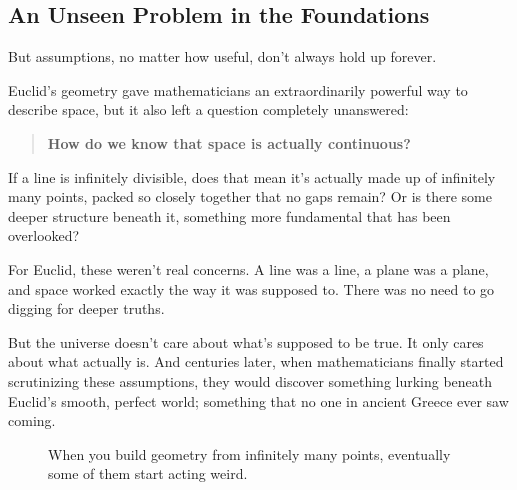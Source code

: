 \subsection{An Unseen Problem in the Foundations}

But assumptions, no matter how useful, don’t always hold up forever.

Euclid’s geometry gave mathematicians an extraordinarily powerful way to describe space, but it also left a question completely unanswered:  

\begin{quote}
\textbf{How do we know that space is actually continuous?}
\end{quote}

If a line is infinitely divisible, does that mean it’s actually made up of infinitely many points, packed so closely together that no gaps remain? Or is there some deeper structure beneath it, something more fundamental that has been overlooked?

For Euclid, these weren’t real concerns. A line was a line, a plane was a plane, and space worked exactly the way it was supposed to. There was no need to go digging for deeper truths.

But the universe doesn’t care about what’s supposed to be true. It only cares about what actually is. And centuries later, when mathematicians finally started scrutinizing these assumptions, they would discover something lurking beneath Euclid’s smooth, perfect world; something that no one in ancient Greece ever saw coming.



\begin{figure}[H]
\centering
{}
\caption{When you build geometry from infinitely many points, eventually some of them start acting weird.}
\end{figure}